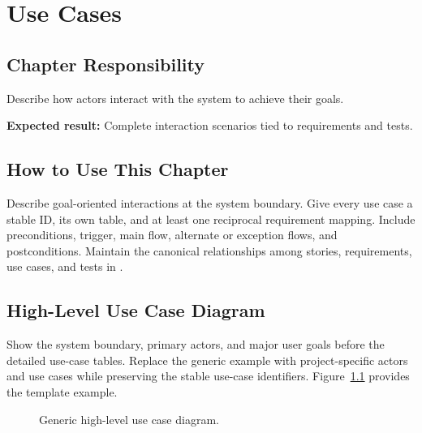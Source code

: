 \chapter{Use Cases}
\section{Chapter Responsibility}
\label{Section:UseCasesResponsibility}
Describe how actors interact with the system to achieve their goals.

\noindent\textbf{Expected result:} Complete interaction scenarios tied to requirements and tests.

\section{How to Use This Chapter}
Describe goal-oriented interactions at the system boundary. Give every use case
a stable ID, its own table, and at least one reciprocal requirement mapping.
Include preconditions, trigger, main flow, alternate or exception flows, and
postconditions. Maintain the canonical relationships among stories,
requirements, use cases, and tests in .

\section[High-Level Use Case Diagram]{\hspace{0.5em}High-Level Use Case Diagram}
Show the system boundary, primary actors, and major user goals before the
detailed use-case tables. Replace the generic example with project-specific
actors and use cases while preserving the stable use-case identifiers.
Figure~\ref{Figure:UseCaseDiagram} provides the template example.

\begin{figure}[htbp]
\centering

\caption{Generic high-level use case diagram.}
\label{Figure:UseCaseDiagram}
\end{figure}

